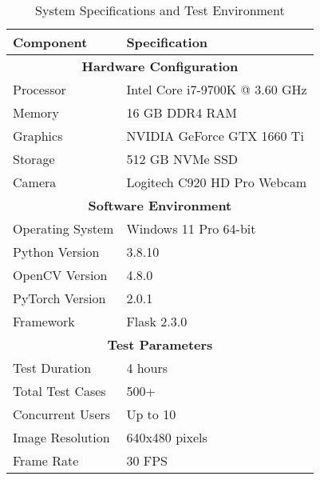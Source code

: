 
\begin{table}[htbp]
\centering
\caption{System Specifications and Test Environment}
\label{tab:system_specs}
\begin{tabular}{|l|l|}
\hline
\textbf{Component} & \textbf{Specification} \\
\hline
\multicolumn{2}{|c|}{\textbf{Hardware Configuration}} \\
\hline
Processor & Intel Core i7-9700K @ 3.60 GHz \\
Memory & 16 GB DDR4 RAM \\
Graphics & NVIDIA GeForce GTX 1660 Ti \\
Storage & 512 GB NVMe SSD \\
Camera & Logitech C920 HD Pro Webcam \\
\hline
\multicolumn{2}{|c|}{\textbf{Software Environment}} \\
\hline
Operating System & Windows 11 Pro 64-bit \\
Python Version & 3.8.10 \\
OpenCV Version & 4.8.0 \\
PyTorch Version & 2.0.1 \\
Framework & Flask 2.3.0 \\
\hline
\multicolumn{2}{|c|}{\textbf{Test Parameters}} \\
\hline
Test Duration & 4 hours \\
Total Test Cases & 500+ \\
Concurrent Users & Up to 10 \\
Image Resolution & 640x480 pixels \\
Frame Rate & 30 FPS \\
\hline
\end{tabular}
\end{table}

